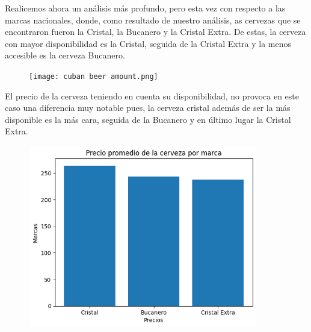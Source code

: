 \documentclass[a4paper,12pt]{article}
\begin{document}
		Realicemos ahora un análisis más profundo, pero esta vez con respecto a las marcas nacionales, donde, como resultado de nuestro análisis, as cervezas que se encontraron fueron la Cristal, la Bucanero y la Cristal Extra. De estas, la cerveza con mayor disponibilidad es la Cristal, seguida de la Cristal Extra y la menos accesible es la cerveza Bucanero.
		
		\begin{figure}[h]
			\centering
			\texttt{[image: cuban beer  amount.png]}
			\label{fig:Disponibilidad de las marcas nacionales}
		\end{figure}
		
		El precio de la cerveza teniendo en cuenta su disponibilidad, no provoca en este caso una diferencia muy notable pues, la cerveza cristal además de ser la más disponible es la más cara, seguida de la Bucanero y en último lugar la Cristal Extra.
		
		\begin{figure}[h]
			\centering
			\includegraphics[width=10cm]{cuban beer price.png}
			\label{fig:Precio de las marcas nacionales}
		\end{figure}
		
\end{document}
